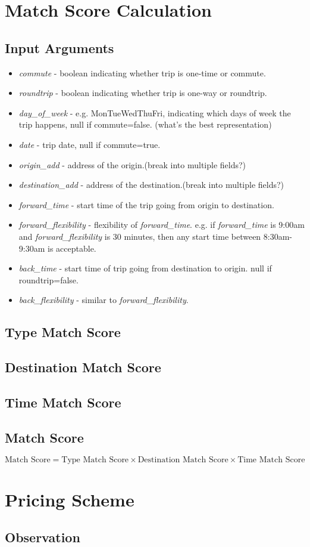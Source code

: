 \documentclass{article}
\begin{document}
\section{Match Score Calculation}
\subsection{Input Arguments}
\begin{itemize}
\item \textit{commute} - boolean indicating whether trip is one-time or commute.
\item \textit{roundtrip} - boolean indicating whether trip is one-way or roundtrip.
\item \textit{day\_of\_week} - e.g. MonTueWedThuFri, indicating which days of week the trip happens, null if commute=false. (what's the best representation)
\item \textit{date} - trip date, null if commute=true.
\item \textit{origin\_add} - address of the origin.(break into multiple fields?)
\item \textit{destination\_add} - address of the destination.(break into multiple fields?)
\item \textit{forward\_time} - start time of the trip going from origin to destination.
\item \textit{forward\_flexibility} - flexibility of \textit{forward\_time}.  e.g. if \textit{forward\_time} is 9:00am and \textit{forward\_flexibility} is 30 minutes, then any start time between 8:30am-9:30am is acceptable.
\item \textit{back\_time} - start time of trip going from destination to origin.  null if roundtrip=false.
\item \textit{back\_flexibility} - similar to \textit{forward\_flexibility}.
\end{itemize}

\subsection{Type Match Score}
\subsection{Destination Match Score}
\subsection{Time Match Score}
\subsection{Match Score}
\begin{equation*}
\mbox{Match Score} = \mbox{Type Match Score} \times \mbox{Destination Match Score} \times \mbox{Time Match Score}
\end{equation*}
\section{Pricing Scheme}
\subsection{Observation}
\end{document}

